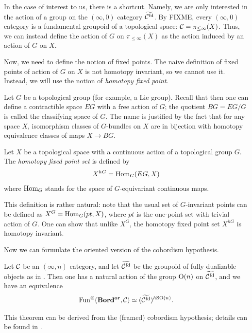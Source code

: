 In the case of interest to us, there is a shortcut.  Namely, we are only
interested in the action of a group on the $(\infty,0)$ category $\widetilde{\mathcal{C}^{{\mathrm{fd}}}}$. By
FIXME, every $(\infty, 0)$ category is a fundamental groupoid of a topological
space: $\mathcal{C}=\pi_{\le \infty}(X)$. Thus, we can instead  define the action of
$G$ on $\pi_{\le \infty}(X)$ as the action induced by an action of $G$ on $X$.


Now, we need to define the notion of fixed points. The naive definition of fixed
points of action of $G$ on $X$ is not homotopy invariant, so we cannot use it.
Instead, we will  use the notion of \emph{homotopy fixed point}.

Let $G$ be a topological group (for example, a Lie group). Recall
that then one can define a contractible space $EG$ with a free action of
$G$; the quotient $BG=EG/G$ is called the classifying space of $G$. The name is
justified by the fact that for any space $X$, isomorphism classes of $G$-bundles
on $X$ are in bijection with homotopy equivalence classes of maps $X\to BG$.

\begin{definition}\label{d:homotopy-fixed}
  Let $X$ be a topological space with a continuous action of a topological
  group $G$. The \emph{homotopy fixed point set} is
  defined by
  $$
    X^{hG} =\operatorname{Hom}_G(EG, X)
  $$
  where $\operatorname{Hom}_G$ stands for the space of $G$-equivariant continuous maps.
\end{definition}

This definition is rather natural: note that the usual set of $G$-invariant
points can be defined as   $X^G=\operatorname{Hom}_G(pt, X)$, where $pt$ is the one-point set
with trivial action of $G$. One can show that unlike $X^G$, the homotopy fixed
point set $X^{hG}$ is homotopy invariant.

Now we can formulate the oriented version of the cobordism hypothesis.

\begin{theorem}\label{t:cob-hyp-or}
  Let $\mathcal{C}$ be an $(\infty, n)$ category, and let $\widetilde{\mathcal{C}^{{\mathrm{fd}}}}$ be the
  groupoid of fully dualizable objects as in .
  Then one has a natural action
  of the group $\mathrm{O}(n)$ on $\widetilde{\mathcal{C}^{{\mathrm{fd}}}}$, and we have an equivalence
  $$
    \operatorname{Fun}^{\otimes}(\mathbf{Bord^{or}}, \mathcal{C})\simeq (\widetilde{\mathcal{C}^{{\mathrm{fd}}}})^{h\mathrm{SO}(n)}.
  $$
  \end{theorem}
This theorem can be  derived from the (framed) cobordism hypothesis;
details can be found in .

